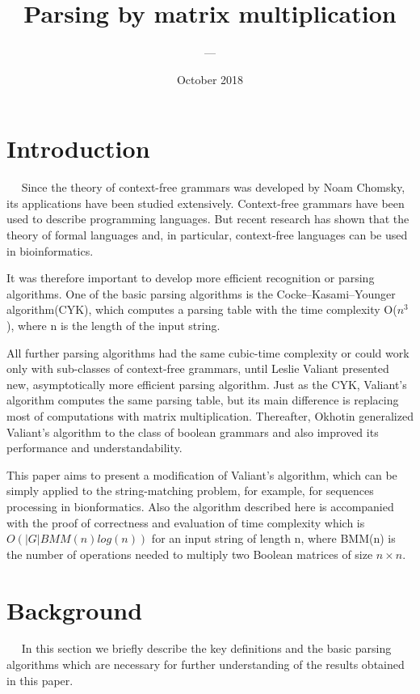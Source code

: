 \documentclass{article}
\title{Parsing by matrix multiplication}
\author{---}
\date{October 2018}
\begin{document}
\maketitle

\section{Introduction}


 $\quad$ Since the theory of context-free grammars was developed by Noam Chomsky, its applications have been studied extensively. Context-free grammars have been used to describe programming languages. But recent research has shown that the theory of formal languages and, in particular, context-free languages can be used in bioinformatics.
 
 It was therefore important to develop more efficient recognition or parsing algorithms. One of the basic parsing algorithms is the Cocke–Kasami–Younger algorithm(CYK)\citep{kasami,younger}, which computes a parsing table with the time complexity O($n^3$), where n is the length of the input string.
 
 All further parsing algorithms had the same cubic-time complexity\citep{earley} or could work only with sub-classes of context-free grammars\citep{bernardy}, until Leslie Valiant presented new, asymptotically more efficient parsing algorithm\citep{valiant}. Just as the CYK, Valiant's algorithm computes the same parsing table, but its main difference is replacing most of computations with matrix multiplication. Thereafter, Okhotin generalized Valiant's algorithm to the class of boolean grammars and also improved its performance and understandability\citep{okhotin}.
 
 This paper aims to present a modification of Valiant's algorithm, which can be simply applied to the string-matching problem, for example, for sequences processing in bionformatics. Also the algorithm described here is accompanied with the proof of correctness and evaluation of time complexity which is  $O(|G|BMM(n)log(n))$ for an input string of length n, where BMM(n) is the number of operations needed to multiply two Boolean matrices of size $n \times n$. 
 
 
 
 
 \section{Background}
 
  $\quad$ In this section we briefly describe the key definitions and the basic parsing algorithms which are necessary for further understanding of the results obtained in this paper.
  
\end{document}

